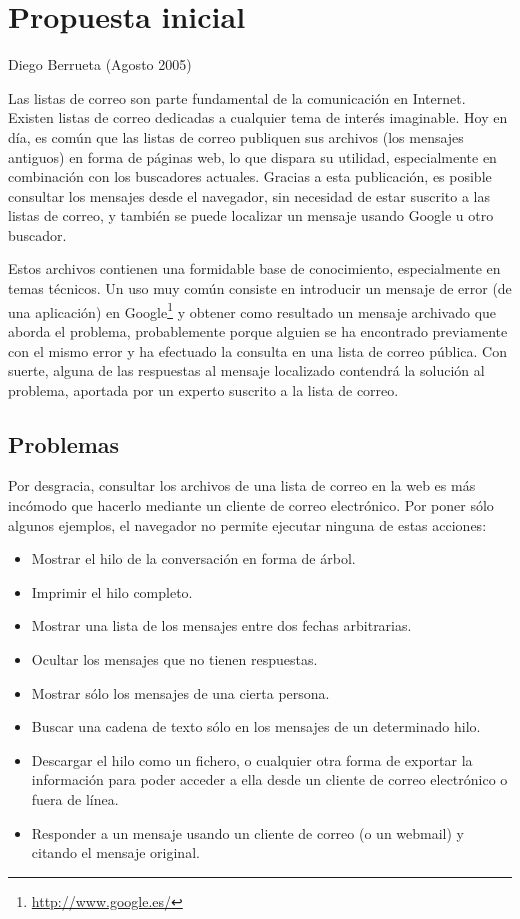 
\chapter{Propuesta inicial\label{sec:propuesta}}

Diego Berrueta (Agosto 2005)

Las listas de correo son parte fundamental de la comunicación en Internet.
Existen listas de correo dedicadas a cualquier tema de inter\'es imaginable.
Hoy en día, es común que las listas de correo publiquen sus archivos (los
mensajes antiguos) en forma de páginas web, lo que dispara su utilidad,
especialmente en combinación con los buscadores actuales. Gracias a esta 
publicación, es posible consultar los mensajes desde el navegador, sin 
necesidad de estar suscrito a las listas de correo, y también se puede 
localizar un mensaje usando Google u otro buscador.

Estos archivos contienen una formidable base de conocimiento, especialmente
en temas técnicos. Un uso muy común consiste en introducir un mensaje de error 
(de una aplicación) en Google\footnote{\url{http://www.google.es/}} y obtener 
como resultado un mensaje archivado que aborda el problema, probablemente 
porque alguien se ha encontrado previamente con el mismo error y ha efectuado 
la consulta en una lista de correo pública. Con suerte, alguna de las respuestas 
al mensaje localizado contendrá la solución al problema, aportada por un experto 
suscrito a la lista de correo.

\section*{Problemas}

Por desgracia, consultar los archivos de una lista de correo en la web es
más incómodo que hacerlo mediante un cliente de correo electrónico.
Por poner sólo algunos ejemplos, el navegador no permite ejecutar ninguna
de estas acciones:

\begin{itemize}
 \item Mostrar el hilo de la conversación en forma de árbol.
 \item Imprimir el hilo completo.
 \item Mostrar una lista de los mensajes entre dos fechas arbitrarias.
 \item Ocultar los mensajes que no tienen respuestas.
 \item Mostrar sólo los mensajes de una cierta persona.
 \item Buscar una cadena de texto sólo en los mensajes de un determinado hilo.
 \item Descargar el hilo como un fichero, o cualquier otra forma de exportar la
 información para poder acceder a ella desde un cliente de correo electrónico
 o fuera de línea.
 \item Responder a un mensaje usando un cliente de correo (o un webmail) y 
 citando el mensaje original.
\end{itemize}

